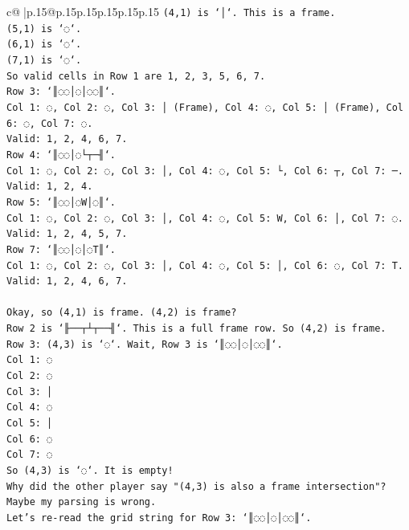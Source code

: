\documentclass{article}
\begin{document}
{\begin{supertabular}{c@{$\;$}|p{.15\linewidth}@{}p{.15\linewidth}p{.15\linewidth}p{.15\linewidth}p{.15\linewidth}p{.15\linewidth}}
{{{\texttt{(4,1) is `│`. This is a frame.} \\
\texttt{(5,1) is `◌`.} \\
\texttt{(6,1) is `◌`.} \\
\texttt{(7,1) is `◌`.} \\
\texttt{So valid cells in Row 1 are 1, 2, 3, 5, 6, 7.} \\
\texttt{Row 3: `║◌◌│◌│◌◌║`.} \\
\texttt{Col 1: ◌, Col 2: ◌, Col 3: │ (Frame), Col 4: ◌, Col 5: │ (Frame), Col 6: ◌, Col 7: ◌.} \\
\texttt{Valid: 1, 2, 4, 6, 7.} \\
\texttt{Row 4: `║◌◌│◌└┬─╢`.} \\
\texttt{Col 1: ◌, Col 2: ◌, Col 3: │, Col 4: ◌, Col 5: └, Col 6: ┬, Col 7: ─.} \\
\texttt{Valid: 1, 2, 4.} \\
\texttt{Row 5: `║◌◌│◌W│◌║`.} \\
\texttt{Col 1: ◌, Col 2: ◌, Col 3: │, Col 4: ◌, Col 5: W, Col 6: │, Col 7: ◌.} \\
\texttt{Valid: 1, 2, 4, 5, 7.} \\
\texttt{Row 7: `║◌◌│◌│◌T║`.} \\
\texttt{Col 1: ◌, Col 2: ◌, Col 3: │, Col 4: ◌, Col 5: │, Col 6: ◌, Col 7: T.} \\
\texttt{Valid: 1, 2, 4, 6, 7.} \\
\\ 
\texttt{Okay, so (4,1) is frame. (4,2) is frame?} \\
\texttt{Row 2 is `╟──┬┴┬──╢`. This is a full frame row. So (4,2) is frame.} \\
\texttt{Row 3: (4,3) is `◌`. Wait, Row 3 is `║◌◌│◌│◌◌║`.} \\
\texttt{Col 1: ◌} \\
\texttt{Col 2: ◌} \\
\texttt{Col 3: │} \\
\texttt{Col 4: ◌} \\
\texttt{Col 5: │} \\
\texttt{Col 6: ◌} \\
\texttt{Col 7: ◌} \\
\texttt{So (4,3) is `◌`. It is empty!} \\
\texttt{Why did the other player say "(4,3) is also a frame intersection"?} \\
\texttt{Maybe my parsing is wrong.} \\
\texttt{Let's re{-}read the grid string for Row 3: `║◌◌│◌│◌◌║`.} \\
}}}
\end{supertabular}}
\end{document}
